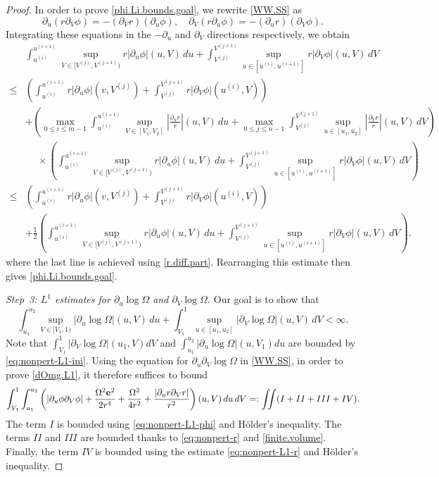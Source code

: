 \documentclass[10pt, reqno]{amsart}
\theoremstyle{definition}
\theoremstyle{remark}
\numberwithin{equation}{section}
\newcommand{\abs}[1]{\vert#1\vert}
\newcommand{\rd}{\partial}
\newcommand{\0}{\emptyset}
\newcommand{\Omg}{\Omega}
\newcommand{\f}{\frac}
\newcommand{\pfstep}[1]{\vspace{.5em} {\it \noindent #1.}}
\begin{document}
\begin{proof}
In order to prove \eqref{phi.Li.bounds.goal}, we rewrite \eqref{WW.SS} as
$$\rd_u(r\rd_{V} \phi)=-(\rd_{V} r)(\rd_u\phi),\quad \rd_{V}(r\rd_u \phi)=-(\rd_u r)(\rd_{V}\phi).$$
Integrating these equations in the $-\rd_u$ and $\rd_{V}$ directions respectively, we obtain
\begin{align*}
& \int_{u^{(i)}}^{u^{(i+1)}}  \sup_{V \in [V^{(j)}, V^{(j+1)})} r \abs{\rd_{u} \phi}(u, V) \, d u 
+ \int_{V^{(j)}}^{V^{(j+1)}} \sup_{u \in [u^{(i)}, u^{(i+1)}]} r \abs{\rd_{V} \phi}(u, V) \, d V  \\
\leq & \left( \int_{u^{(i)}}^{u^{(i+1)}} r |\rd_{u}\phi|(v,V^{(j)})+\int_{V^{(j)}}^{V^{(j+1)}} r |\rd_{V}\phi|(u^{(i)},V)\right) \\
& + \left( \max_{0\leq i\leq m-1}\int_{u^{(i)}}^{u^{(i+1)}} \sup_{ V\in [ V_1, V_2]}\left|\f{\rd_u r}{r}\right|(u, V)\, du+\max_{0\leq j\leq n-1}\int_{V^{(j)}}^{V^{(j+1)}}\sup_{u\in [u_1,u_2]}\left|\f{\rd_{V} r}{r}\right|(u,V)\,d V 
 \right) \\
 & \phantom{+} \times \left( \int_{u^{(i)}}^{u^{(i+1)}}  \sup_{V \in [V^{(j)}, V^{(j+1)})} r \abs{\rd_{u} \phi}(u, V) \, d u 
+ \int_{V^{(j)}}^{V^{(j+1)}} \sup_{u \in [u^{(i)}, u^{(i+1)}]} r \abs{\rd_{V} \phi}(u, V) \, d V \right) \\
\leq & \left( \int_{u^{(i)}}^{u^{(i+1)}} r |\rd_{u}\phi|(v,V^{(j)})+\int_{V^{(j)}}^{V^{(j+1)}} r |\rd_{V}\phi|(u^{(i)},V)\right) \\
& + \frac{1}{2} \left( \int_{u^{(i)}}^{u^{(i+1)}}  \sup_{V \in [V^{(j)}, V^{(j+1)})} r \abs{\rd_{u} \phi}(u, V) \, d u 
+ \int_{V^{(j)}}^{V^{(j+1)}} \sup_{u \in [u^{(i)}, u^{(i+1)}]} r \abs{\rd_{V} \phi}(u, V) \, d V \right).
\end{align*}
where the last line is achieved using \eqref{r.diff.part}. Rearranging this estimate then gives \eqref{phi.Li.bounds.goal}.

\pfstep{Step~3: $L^1$ estimates for $\rd_u\log \Omg$ and $\rd_{V} \log \Omg$} Our goal is to show that
\begin{equation}\label{dOmg.L1}
\int_{u_1}^{u_2} \sup_{V\in [V_1, 1)}\left|\rd_u \log \Omg \right|(u, V)\, du+\int_{V_{1}}^{1} \sup_{u\in [u_1,u_2]}\left|\rd_{V} \log \Omg \right|(u, V)\,d V<\infty.
\end{equation}
Note that $\int_{V_{1}}^{1} |\rd_{V} \log \Omg| (u_{1}, V) d V$ and $\int_{u_{1}}^{u_{2}} |\rd_{u} \log \Omg| (u, V_{1}) d u$ are bounded by \eqref{eq:nonpert-L1-ini}.
Using the equation for $\rd_u\rd_{V} \log\Omg$ in \eqref{WW.SS}, in order to prove \eqref{dOmg.L1}, it therefore suffices to bound
\begin{equation*}
\begin{split}
\int_{V_1}^{1}\int_{u_1}^{u_2}\left(|\rd_u\phi\rd_{V}\phi|+\f { \Omg^2 {\bf e}^2}{2 r^4}+\f{\Omg^2}{4r^2}+\f{|\rd_u r\rd_{V} r|}{r^2}\right)(u, V)\, du\, d V=:\iint (I+II+III+IV).
\end{split}
\end{equation*}
The term $I$ is bounded using \eqref{eq:nonpert-L1-phi} and H\"older's inequality. The terms $II$ and $III$ are bounded thanks to \eqref{eq:nonpert-r} and \eqref{finite.volume}. Finally, the term $IV$ is bounded using the estimate \eqref{eq:nonpert-L1-r} and H\"older's inequality.
\end{proof}
\end{document}
